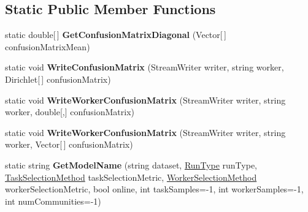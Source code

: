 \subsection*{Static Public Member Functions}
\begin{DoxyCompactItemize}
\item 
\hypertarget{class_crowdsourcing_models_1_1_results_ad84f5e51fdbb8934e2028965743f36b8}{}static double\mbox{[}$\,$\mbox{]} {\bfseries Get\+Confusion\+Matrix\+Diagonal} (Vector\mbox{[}$\,$\mbox{]} confusion\+Matrix\+Mean)\label{class_crowdsourcing_models_1_1_results_ad84f5e51fdbb8934e2028965743f36b8}

\item 
\hypertarget{class_crowdsourcing_models_1_1_results_ac5ec09f57d9177d414c2ae6e9155f631}{}static void {\bfseries Write\+Confusion\+Matrix} (Stream\+Writer writer, string worker, Dirichlet\mbox{[}$\,$\mbox{]} confusion\+Matrix)\label{class_crowdsourcing_models_1_1_results_ac5ec09f57d9177d414c2ae6e9155f631}

\item 
\hypertarget{class_crowdsourcing_models_1_1_results_ae5556eb0e898f4f991c51668350efa08}{}static void {\bfseries Write\+Worker\+Confusion\+Matrix} (Stream\+Writer writer, string worker, double\mbox{[},\mbox{]} confusion\+Matrix)\label{class_crowdsourcing_models_1_1_results_ae5556eb0e898f4f991c51668350efa08}

\item 
\hypertarget{class_crowdsourcing_models_1_1_results_ae5f852bf1ad4581c667c7aa5b0235320}{}static void {\bfseries Write\+Worker\+Confusion\+Matrix} (Stream\+Writer writer, string worker, Vector\mbox{[}$\,$\mbox{]} confusion\+Matrix)\label{class_crowdsourcing_models_1_1_results_ae5f852bf1ad4581c667c7aa5b0235320}

\item 
\hypertarget{class_crowdsourcing_models_1_1_results_a53a1a91b8f91b8c206acf44b01a29cab}{}static string {\bfseries Get\+Model\+Name} (string dataset, \hyperlink{namespace_crowdsourcing_models_ae187d0e1d9fe64e7ebcb9d948d02d2d0}{Run\+Type} run\+Type, \hyperlink{namespace_crowdsourcing_models_a1bb21d66b6c86daa36af97d919528356}{Task\+Selection\+Method} task\+Selection\+Metric, \hyperlink{namespace_crowdsourcing_models_a1f0e849dc0691caa8fda0ce7778756a6}{Worker\+Selection\+Method} worker\+Selection\+Metric, bool online, int task\+Samples=-\/1, int worker\+Samples=-\/1, int num\+Communities=-\/1)\label{class_crowdsourcing_models_1_1_results_a53a1a91b8f91b8c206acf44b01a29cab}

\end{DoxyCompactItemize}
